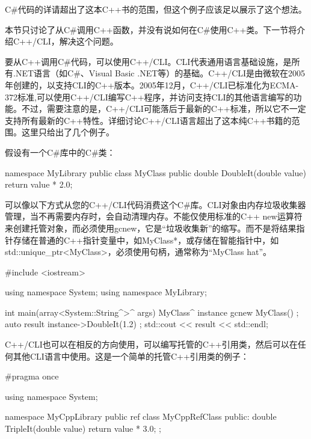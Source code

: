 C\#代码的详请超出了这本C++书的范围，但这个例子应该足以展示了这个想法。

本节只讨论了从C\#调用C++函数，并没有说如何在C\#使用C++类。下一节将介绍C++/CLI，解决这个问题。


要从C++调用C\#代码，可以使用C++/CLI。CLI代表通用语言基础设施，是所有.NET语言（如C\#、Visual Basic .NET等）的基础。C++/CLI是由微软在2005年创建的，以支持CLI的C++版本。2005年12月，C++/CLI已标准化为ECMA-372标准,可以使用C++/CLI编写C++程序，并访问支持CLI的其他语言编写的功能。不过，需要注意的是，C++/CLI可能落后于最新的C++标准，所以它不一定支持所有最新的C++特性。详细讨论C++/CLI语言超出了这本纯C++书籍的范围。这里只给出了几个例子。

假设有一个C\#库中的C\#类：

\begin{cpp}
namespace MyLibrary
{
    public class MyClass
    {
        public double DoubleIt(double value) { return value * 2.0; }
    }
}
\end{cpp}

可以像以下方式从您的C++/CLI代码消费这个C\#库。CLI对象由内存垃圾收集器管理，当不再需要内存时，会自动清理内存。不能仅使用标准的C++ new运算符来创建托管对象，而必须使用gcnew，它是“垃圾收集新”的缩写。而不是将结果指针存储在普通的C++指针变量中，如MyClass*，或存储在智能指针中，如std::unique\_ptr<MyClass>，必须使用句柄，通常称为“MyClass hat”。

\begin{cpp}
#include <iostream>

using namespace System;
using namespace MyLibrary;

int main(array<System::String^>^ args)
{
    MyClass^ instance { gcnew MyClass() };
    auto result { instance->DoubleIt(1.2) };
    std::cout << result << std::endl;
}
\end{cpp}

C++/CLI也可以在相反的方向使用，可以编写托管的C++引用类，然后可以在任何其他CLI语言中使用。这是一个简单的托管C++引用类的例子：

\begin{cpp}
#pragma once

using namespace System;

namespace MyCppLibrary
{
    public ref class MyCppRefClass
    {
        public:
            double TripleIt(double value) { return value * 3.0; }
    };
}
\end{cpp}

